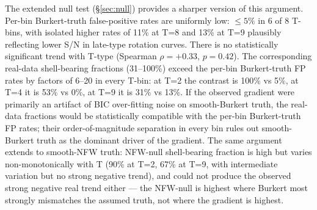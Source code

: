 The extended null test (\S\ref{sec:null}) provides a sharper version of this argument. Per-bin Burkert-truth false-positive rates are uniformly low: $\leq 5\%$ in 6 of 8 T-bins, with isolated higher rates of 11\% at T=8 and 13\% at T=9 plausibly reflecting lower S/N in late-type rotation curves. There is no statistically significant trend with T-type (Spearman $\rho = +0.33$, $p = 0.42$). The corresponding real-data shell-bearing fractions (31--100\%) exceed the per-bin Burkert-truth FP rates by factors of 6--20 in every T-bin: at T=2 the contrast is 100\% vs 5\%, at T=4 it is 53\% vs 0\%, at T=9 it is 31\% vs 13\%. If the observed gradient were primarily an artifact of BIC over-fitting noise on smooth-Burkert truth, the real-data fractions would be statistically compatible with the per-bin Burkert-truth FP rates; their order-of-magnitude separation in every bin rules out smooth-Burkert truth as the dominant driver of the gradient. The same argument extends to smooth-NFW truth: NFW-null shell-bearing fraction is high but varies non-monotonically with T (90\% at T=2, 67\% at T=9, with intermediate variation but no strong negative trend), and could not produce the observed strong negative real trend either --- the NFW-null is highest where Burkert most strongly mismatches the assumed truth, not where the gradient is highest.

